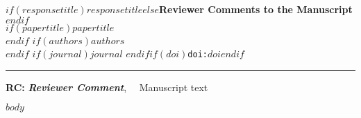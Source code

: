 \documentclass{article}
\begin{document}
{\Large\bf $if(responsetitle)$$responsetitle$$else$Reviewer Comments to the Manuscript$endif$}\\[1em]
$if(papertitle)${\huge $papertitle$}\\[1em]$endif$
$if(authors)${$authors$}\\$endif$
$if(journal)${\it $journal$ }$endif$$if(doi)$\texttt{doi:$doi$}$endif$\\
\hrule

\hfill {\bfseries \color{gray}RC:} \textbf{\color{gray}\textit{Reviewer Comment}},\(\quad\) \vrule width 3pt \hspace{5pt} {\selectfont Manuscript text}

$body$
\end{document}
